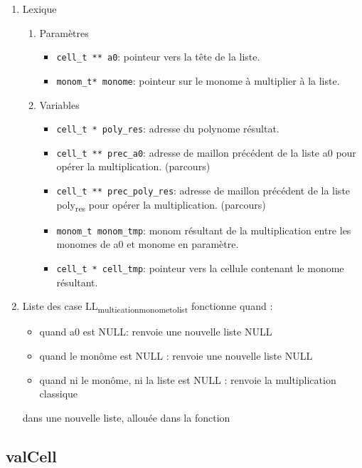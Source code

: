 \documentclass[11pt]{article}
\begin{document}
\begin{enumerate}
\item Lexique
\label{sec:org5df118a}
\begin{enumerate}
\item Paramètres
\label{sec:org5678c4d}
\begin{itemize}
\item \texttt{cell\_t ** a0}: pointeur vers la tête de la liste.
\item \texttt{monom\_t* monome}: pointeur sur le monome à multiplier à la liste.
\end{itemize}
\item Variables
\label{sec:org4701946}
\begin{itemize}
\item \texttt{cell\_t * poly\_res}: adresse du polynome résultat.
\item \texttt{cell\_t ** prec\_a0}: adresse de maillon précédent de la liste a0 pour opérer la multiplication. (parcours)
\item \texttt{cell\_t ** prec\_poly\_res}: adresse de maillon précédent de la liste poly\textsubscript{res} pour opérer la multiplication. (parcours)
\item \texttt{monom\_t monom\_tmp}: monom résultant de la multiplication entre les monomes de a0 et monome en paramètre.
\item \texttt{cell\_t * cell\_tmp}: pointeur vers la cellule contenant le monome résultant.
\end{itemize}
\end{enumerate}

\item Liste des case
\label{sec:org0a19afb}
LL\textsubscript{multication}\textsubscript{monome}\textsubscript{to}\textsubscript{list} fonctionne quand :
\begin{itemize}
\item quand a0 est NULL: renvoie une nouvelle liste NULL
\item quand le monôme est NULL : renvoie une nouvelle liste NULL
\item quand ni le monôme, ni la liste est NULL : renvoie la multiplication classique
\end{itemize}
dans une nouvelle liste, allouée dans la fonction
\end{enumerate}

\subsection{valCell}
\label{sec:org2012bb8}
\end{document}
